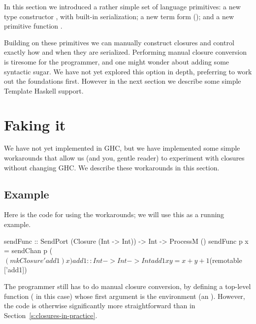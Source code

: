 \documentclass{sigplanconf}
\begin{document}
In this section we introduced a rather simple set of language primitives:
a new type constructor , with built-in serialization; 
a new term form ($\!$);
and a new primitive function .


\lstset{mathescape=false}

Building on these primitives we can manually construct closures and
control exactly how and when they are serialized.
Performing manual closure conversion is tiresome for the programmer,
and one might wonder about adding some syntactic sugar.
We have not yet explored this option in depth, preferring to work out the
foundations first.
However in the next section we describe some simple Template Haskell support.


\section{Faking it}
\label{s:faking}

We have not yet implemented  in GHC, but we have implemented
some simple workarounds that allow us (and you, gentle reader) to experiment
with closures without changing GHC.  We describe these workarounds in this section.

\subsection{Example}
Here is the code for  using the workarounds; we will use this as a running example.
\begin{code}
  sendFunc :: SendPort (Closure (Int -> Int)) 
                              -> Int -> ProcessM ()
  sendFunc p x = sendChan p ($(mkClosure 'add1) x)

  add1 :: Int -> Int -> Int
  add1 x y = x + y + 1

  $(remotable ['add1])
\end{code}
The programmer still has to do manual closure conversion, by defining
a top-level function ( in this case) whose first argument is
the environment (an ).  However, the code is otherwise significantly more 
straightforward than in Section~\ref{s:closures-in-practice}.
\end{document}
